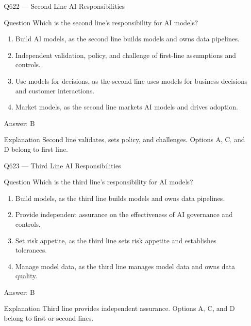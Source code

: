 \documentclass[aspectratio=169,8pt]{beamer}
\begin{document}
	\begin{frame}{Q622 --- Second Line AI Responsibilities}
		\begin{block}{Question}
			Which is the second line's responsibility for AI models?
			\begin{enumerate}
				\item Build AI models, as the second line builds models and owns data pipelines.
				\item Independent validation, policy, and challenge of first-line assumptions and controls.
				\item Use models for decisions, as the second line uses models for business decisions and customer interactions.
				\item Market models, as the second line markets AI models and drives adoption.
			\end{enumerate}
		\end{block}
		\begin{exampleblock}{Answer: B}\end{exampleblock}
		\begin{block}{Explanation}
			Second line validates, sets policy, and challenges. Options A, C, and D belong to first line.
		\end{block}
	\end{frame}
	
	\begin{frame}{Q623 --- Third Line AI Responsibilities}
		\begin{block}{Question}
			Which is the third line's responsibility for AI models?
			\begin{enumerate}
				\item Build models, as the third line builds models and owns data pipelines.
				\item Provide independent assurance on the effectiveness of AI governance and controls.
				\item Set risk appetite, as the third line sets risk appetite and establishes tolerances.
				\item Manage model data, as the third line manages model data and owns data quality.
			\end{enumerate}
		\end{block}
		\begin{exampleblock}{Answer: B}\end{exampleblock}
		\begin{block}{Explanation}
			Third line provides independent assurance. Options A, C, and D belong to first or second lines.
		\end{block}
	\end{frame}
	
\end{document}
